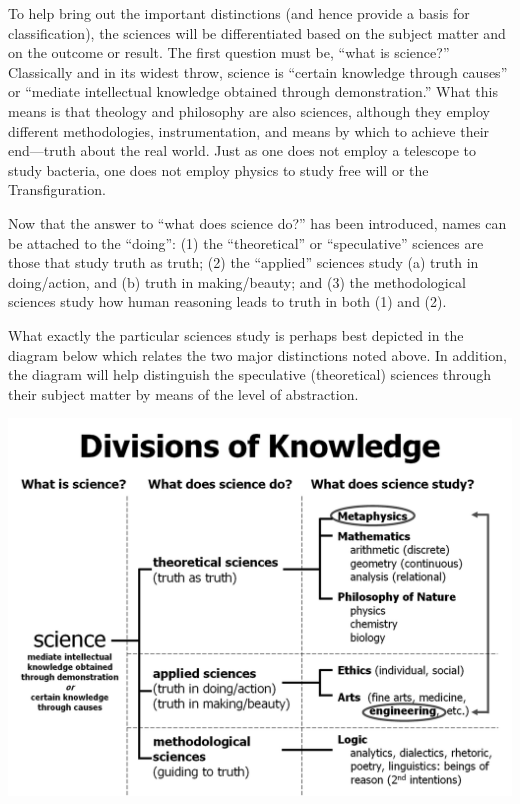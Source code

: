 To help bring out the important distinctions (and hence provide a basis for classification), the sciences will be differentiated based on the subject matter and on the outcome or result. The first question must be, ``what is science?'' Classically and in its widest throw, science is ``certain knowledge through causes'' or ``mediate intellectual knowledge obtained through demonstration.'' What this means is that theology and philosophy are also sciences, although they employ different methodologies, instrumentation, and means by which to achieve their end---truth about the real world. Just as one does not employ a telescope to study bacteria, one does not employ physics to study free will or the Transfiguration.

Now that the answer to ``what does science do?'' has been introduced, names can be attached to the ``doing'': (1) the ``theoretical'' or ``speculative'' sciences are those that study truth as truth; (2) the ``applied'' sciences study (a) truth in doing/action, and (b) truth in making/beauty; and (3) the methodological sciences study how human reasoning leads to truth in both (1) and (2).

What exactly the particular sciences study is perhaps best depicted in the diagram below which relates the two major distinctions noted above. In addition, the diagram will help distinguish the speculative (theoretical) sciences through their subject matter by means of the level of abstraction.

\begin{center}
\includegraphics[scale=0.6]{sich_science_taxonomy.jpg}
\end{center}

